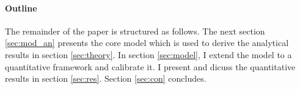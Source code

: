 







\paragraph{Outline}
The remainder of the paper is structured as follows. The next section \ref{sec:mod_an} presents the core model which is used to derive the analytical results in section \ref{sec:theory}. In section \ref{sec:model}, I extend the model to a quantitative framework and calibrate it. I present and dicuss the quantitative results in section \ref{sec:res}. Section \ref{sec:con} concludes.